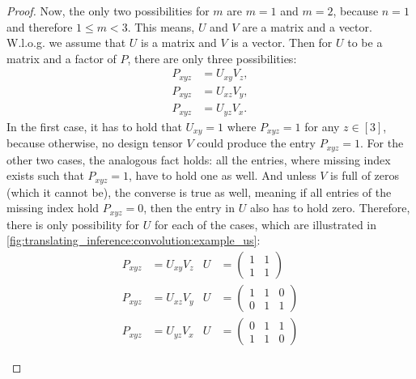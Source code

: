\begin{proof}
    Now, the only two possibilities for $m$ are $m = 1$ and $m = 2$, because $n = 1$ and therefore $1 \leq m < 3$.
    This means, $U$ and $V$ are a matrix and a vector.
    W.l.o.g. we assume that $U$ is a matrix and $V$ is a vector.
    Then for $U$ to be a matrix and a factor of $P$, there are only three possibilities:
    \begin{align*}
        P_{xyz} & = U_{xy} V_z, \\
        P_{xyz} & = U_{xz} V_y, \\
        P_{xyz} & = U_{yz} V_x.
    \end{align*}
    In the first case, it has to hold that $U_{xy} = 1$ where $P_{xyz} = 1$ for any $z \in [3]$,
    because otherwise, no design tensor $V$ could produce the entry $P_{xyz} = 1$.
    For the other two cases, the analogous fact holds:
    all the entries, where missing index exists such that $P_{xyz} = 1$, have to hold one as well.
    And unless $V$ is full of zeros (which it cannot be), the converse is true as well,
    meaning if all entries of the missing index hold $P_{xyz} = 0$, then the entry in $U$ also has to hold zero.
    Therefore, there is only possibility for $U$ for each of the cases, which are illustrated in \cref{fig:translating_inference:convolution:example_us}:
    \begin{align*}
        P_{xyz} & = U_{xy} V_z & U & = \begin{pmatrix} 1 & 1 \\ 1 & 1 \end{pmatrix} \\
        P_{xyz} & = U_{xz} V_y & U & = \begin{pmatrix} 1 & 1 & 0 \\ 0 & 1 & 1 \end{pmatrix} \\
        P_{xyz} & = U_{yz} V_x & U & = \begin{pmatrix} 0 & 1 & 1 \\ 1 & 1 & 0 \end{pmatrix}
    \end{align*}
    \begin{figure}
        \centering
        \begin{subfigure}{0.3\textwidth}
\end{subfigure}
\end{figure}
\end{proof}
